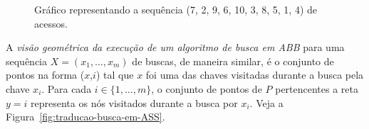 \begin{figure}
    \caption{Gráfico representando a sequência (7, 2, 9, 6, 10, 3, 8, 5, 1, 4) de acessos.}
\label{fig:busca_padrao}
\end{figure}

A \textit{visão geométrica da execução de um algoritmo de busca em ABB} para uma sequência $X = (x_{1},\ldots,x_{m})$ de buscas, de maneira similar, é o conjunto de pontos na forma ($x$,$i$) tal que $x$ foi uma das chaves visitadas durante a busca pela chave $x_i$. Para cada $i \in \{1,\ldots,m\}$, o conjunto de pontos de $P$ pertencentes a reta $y = i$ representa os nós visitados durante a busca por $x_i$. Veja a Figura~\ref{fig:traducao-busca-em-ASS}.

